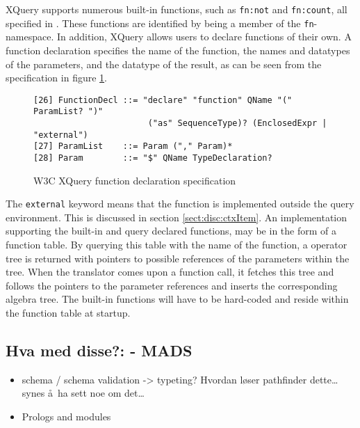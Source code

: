 XQuery supports numerous built-in functions, such as \texttt{fn:not} and \texttt{fn:count}, all
specified in \cite{w3cfuncOps}. These functions are identified by being a member of the \texttt{fn}-namespace. In
addition, XQuery allows users to declare functions of their own. A function declaration specifies the name of the
function, the names and datatypes of the parameters, and the datatype of the result, as can be seen from the
specification in figure \ref{fig:disc:not:funcEBNF}.

\begin{figure}[h]
\begin{Verbatim}
[26] FunctionDecl ::= "declare" "function" QName "(" ParamList? ")" 
                       ("as" SequenceType)? (EnclosedExpr | "external")
[27] ParamList    ::= Param ("," Param)*
[28] Param        ::= "$" QName TypeDeclaration?
\end{Verbatim}
\caption{W3C XQuery function declaration specification\cite{w3c00}\label{fig:disc:not:funcEBNF}}
\end{figure}

The \texttt{external} keyword means that the function is implemented outside the query environment. This is
discussed in section \ref{sect:disc:ctxItem}. An implementation supporting the built-in and query declared
functions, may be in the form of a function table. By querying this table with the name of the function, a
operator tree is returned with pointers to possible references of the parameters within the tree. When the
translator comes upon a function call, it fetches this tree and follows the pointers to the parameter references
and inserts the corresponding algebra tree. The built-in functions will have to be hard-coded and reside within
the function table at startup.

\subsection{Hva med disse?: - {MADS}}

  	\begin{itemize}
  		\item schema / schema validation -> typeting? Hvordan l\o ser pathfinder dette\ldots synes \aa~ha sett noe om
  		det\ldots
  		\item Prologs and modules
  		\end{itemize}


